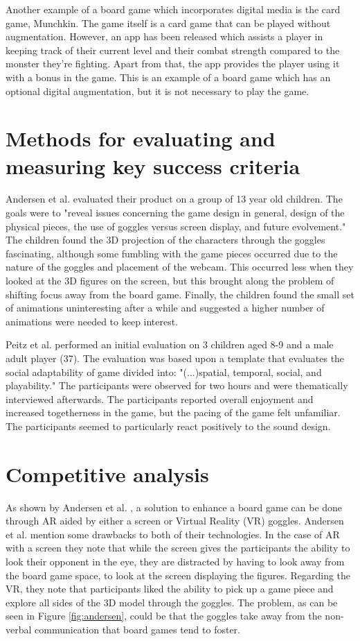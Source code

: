 Another example of a board game which incorporates digital media is the card game, Munchkin. The game itself is a card game that can be played without augmentation. However, an app has been released which assists a player in keeping track of their current level and their combat strength compared to the monster they're fighting. Apart from that, the app provides the player using it with a bonus in the game\citep{Munchkin}. This is an example of a board game which has an optional digital augmentation, but it is not necessary to play the game.

\section{Methods for evaluating and measuring key success criteria}
Andersen et al. \citep{andersen_designing_2004} evaluated their product on a group of 13 year old children. The goals were to "reveal issues concerning the game design in general, design of the physical pieces, the use of goggles versus screen display, and future evolvement." The children found the 3D projection of the characters through the goggles fascinating, although some fumbling with the game pieces occurred due to the nature of the goggles and placement of the webcam. This occurred less when they looked at the 3D figures on the screen, but this brought along the problem of shifting focus away from the board game.
Finally, the children found the small set of animations uninteresting after a while and suggested a higher number of animations were needed to keep interest.

Peitz et al. \citep{peitzWizards2006} performed an initial evaluation on 3 children aged 8-9 and a male adult player (37). The evaluation was based upon a template that evaluates the social adaptability of game divided into: "(...)spatial, temporal, social, and playability." The participants were observed for two hours and were thematically interviewed afterwards. The participants reported overall enjoyment and increased togetherness in the game, but the pacing of the game felt unfamiliar. The participants seemed to particularly react positively to the sound design. 

\section{Competitive analysis}
As shown by Andersen et al. \citep{andersen_designing_2004}, a solution to enhance a board game can be done through AR aided by either a screen or Virtual Reality (VR) goggles. Andersen et al. mention some drawbacks to both of their technologies. In the case of AR with a screen they note that while the screen gives the participants the ability to look their opponent in the eye, they are distracted by having to look away from the board game space, to look at the screen displaying the figures. Regarding the VR, they note that participants liked the ability to pick up a game piece and explore all sides of the 3D model through the goggles. The problem, as can be seen in Figure \ref{fig:andersen}, could be that the goggles take away from the non-verbal communication that board games tend to foster.

